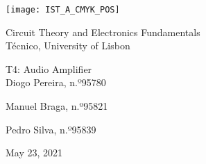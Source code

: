 
\thispagestyle {empty}

\texttt{[image: IST\_A\_CMYK\_POS]}

\begin{center}
%
\vspace{1.0cm}

\vspace{1cm}
{\FontLb Circuit Theory and Electronics Fundamentals} \\ %
\vspace{1cm}
{\FontSn Técnico, University of Lisbon} \\ %
\vspace{1cm}

{\FontSn T4: Audio Amplifier} \\
\vspace{1cm}
{\FontSn Diogo Pereira, n.º95780}
\par{\FontSn Manuel Braga, n.º95821}
\par{\FontSn Pedro Silva, n.º95839}
\vspace{1.0cm}
\par{\FontSn May 23, 2021} \\ %
%
\end{center}


